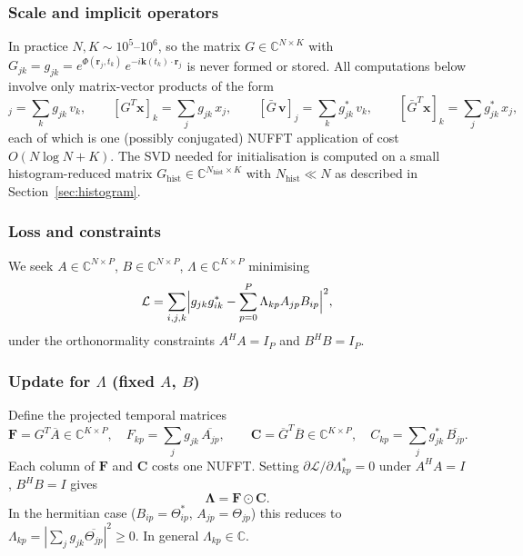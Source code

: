 \documentclass{article}
\begin{document}
\subsubsection*{Scale and implicit operators}

In practice $N, K \sim 10^5$--$10^6$, so the matrix $G \in \mathbb{C}^{N \times K}$
with $G_{jk} = g_{jk} = e^{\Phi(\mathbf{r}_j,t_k)}\,e^{-i\mathbf{k}(t_k)\cdot\mathbf{r}_j}$
is never formed or stored.
All computations below involve only matrix-vector products of the form
\begin{equation}
    [G\,\mathbf{v}]_j = \sum_k g_{jk}\,v_k,
    \qquad
    [G^T\mathbf{x}]_k = \sum_j g_{jk}\,x_j,
    \qquad
    [\bar{G}\,\mathbf{v}]_j = \sum_k g^*_{jk}\,v_k,
    \qquad
    [\bar{G}^T\mathbf{x}]_k = \sum_j g^*_{jk}\,x_j,
\end{equation}
each of which is one (possibly conjugated) NUFFT application of cost $O(N\log N + K)$.
The SVD needed for initialisation is computed on a small histogram-reduced matrix
$G_{\mathrm{hist}} \in \mathbb{C}^{N_{\mathrm{hist}} \times K}$ with
$N_{\mathrm{hist}} \ll N$ as described in Section~\ref{sec:histogram}.

\subsubsection*{Loss and constraints}

We seek $A \in \mathbb{C}^{N \times P}$, $B \in \mathbb{C}^{N \times P}$,
$\Lambda \in \mathbb{C}^{K \times P}$ minimising
\begin{equation}
    \mathcal{L}
    = \sum_{i,j,k}
      \Bigl|g_{jk}g^*_{ik} - \sum_{p=0}^P \Lambda_{kp}A_{jp}B_{ip}\Bigr|^2,
    \label{eq:nonherm_loss}
\end{equation}
under the orthonormality constraints $A^H A = I_P$ and $B^H B = I_P$.

\subsubsection*{Update for $\Lambda$ (fixed $A$, $B$)}

Define the projected temporal matrices
\begin{equation}
    \mathbf{F} = G^T\overline{A} \in \mathbb{C}^{K \times P},
    \quad F_{kp} = \sum_j g_{jk}\,\overline{A_{jp}},
    \qquad
    \mathbf{C} = \overline{G}^T\overline{B} \in \mathbb{C}^{K \times P},
    \quad C_{kp} = \sum_j g^*_{jk}\,\overline{B_{jp}}.
    \label{eq:FC_def}
\end{equation}
Each column of $\mathbf{F}$ and $\mathbf{C}$ costs one NUFFT.
Setting $\partial\mathcal{L}/\partial\Lambda^*_{kp} = 0$ under $A^HA=I$, $B^HB=I$ gives
\begin{equation}
    \boldsymbol{\Lambda} = \mathbf{F} \odot \mathbf{C}.
    \label{eq:lambda_update}
\end{equation}
In the hermitian case ($B_{ip}=\Theta^*_{ip}$, $A_{jp}=\Theta_{jp}$) this reduces to
$\Lambda_{kp} = |\sum_j g_{jk}\overline{\Theta_{jp}}|^2 \geq 0$.
In general $\Lambda_{kp} \in \mathbb{C}$.
\end{document}

